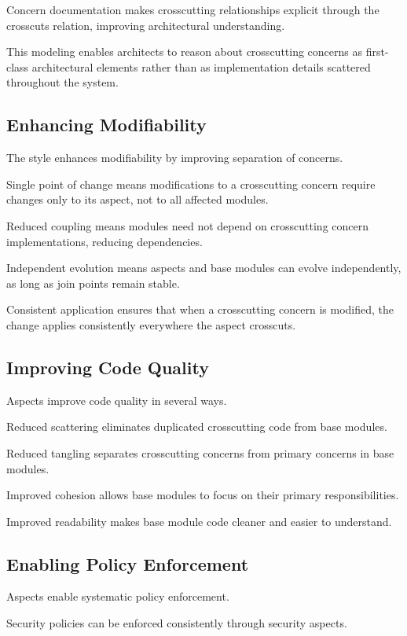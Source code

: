\documentclass[11pt]{article}
\begin{document}
Concern documentation makes crosscutting relationships explicit through the crosscuts relation, improving architectural understanding.

This modeling enables architects to reason about crosscutting concerns as first-class architectural elements rather than as implementation details scattered throughout the system.

\subsection{Enhancing Modifiability}

The style enhances modifiability by improving separation of concerns.

Single point of change means modifications to a crosscutting concern require changes only to its aspect, not to all affected modules.

Reduced coupling means modules need not depend on crosscutting concern implementations, reducing dependencies.

Independent evolution means aspects and base modules can evolve independently, as long as join points remain stable.

Consistent application ensures that when a crosscutting concern is modified, the change applies consistently everywhere the aspect crosscuts.

\subsection{Improving Code Quality}

Aspects improve code quality in several ways.

Reduced scattering eliminates duplicated crosscutting code from base modules.

Reduced tangling separates crosscutting concerns from primary concerns in base modules.

Improved cohesion allows base modules to focus on their primary responsibilities.

Improved readability makes base module code cleaner and easier to understand.

\subsection{Enabling Policy Enforcement}

Aspects enable systematic policy enforcement.

Security policies can be enforced consistently through security aspects.
\end{document}
